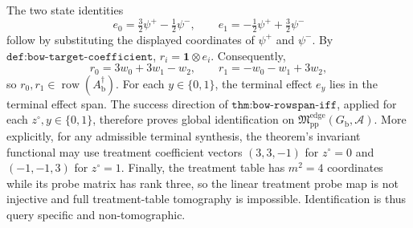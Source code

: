The two state identities
\[
e_0=\tfrac32\psi^+-\tfrac12\psi^- ,
\qquad
e_1=-\tfrac12\psi^++\tfrac32\psi^-
\]
follow by substituting the displayed coordinates of \(\psi^+\) and \(\psi^-\).  By \(\texttt{def:bow-target-coefficient}\), \(r_i=\mathbf 1\otimes e_i\).  Consequently,
\[
r_0=3w_0+3w_1-w_2,
\qquad
r_1=-w_0-w_1+3w_2,
\]
so \(r_0,r_1\in\operatorname{row}(A_{\mathrm b}^{\dagger})\).  For each \(y\in\{0,1\}\), the terminal effect \(e_y\) lies in the terminal effect span.  The success direction of \(\texttt{thm:bow-rowspan-iff}\), applied for each \(z^{\circ},y\in\{0,1\}\), therefore proves global identification on \(\mathfrak M_{\mathrm{pp}}^{\mathrm{edge}}(G_{\mathrm b},\mathcal A)\).  More explicitly, for any admissible terminal synthesis, the theorem's invariant functional may use treatment coefficient vectors \((3,3,-1)\) for \(z^{\circ}=0\) and \((-1,-1,3)\) for \(z^{\circ}=1\).  Finally, the treatment table has \(m^2=4\) coordinates while its probe matrix has rank three, so the linear treatment probe map is not injective and full treatment-table tomography is impossible.  Identification is thus query specific and non-tomographic.